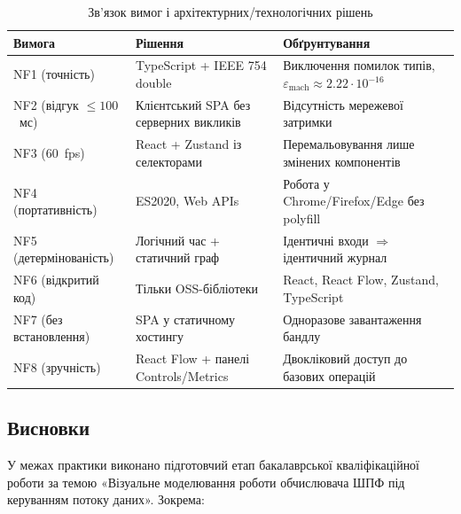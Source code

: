 \documentclass[14pt,a4paper]{extarticle}
\begin{document}
\begin{table}[H]
  \caption{Зв'язок вимог і архітектурних/технологічних рішень}
  \label{tab:req_to_tech}
  \centering
  \small
  \begin{tabular}{p{2.2cm}p{5.6cm}p{6.0cm}}
    \toprule
    Вимога & Рішення & Обґрунтування \\
    \midrule
    NF1 (точність)        & TypeScript + IEEE 754 double         & Виключення помилок типів, $\varepsilon_{\mathrm{mach}}{\approx}2.22{\cdot}10^{-16}$ \\
    NF2 (відгук $\le 100$~мс) & Клієнтський SPA без серверних викликів & Відсутність мережевої затримки \\
    NF3 (60~fps)          & React + Zustand із селекторами       & Перемальовування лише змінених компонентів \\
    NF4 (портативність)   & ES2020, Web APIs                     & Робота у Chrome/Firefox/Edge без polyfill \\
    NF5 (детермінованість) & Логічний час + статичний граф       & Ідентичні входи $\Rightarrow$ ідентичний журнал \\
    NF6 (відкритий код)   & Тільки OSS-бібліотеки                & React, React Flow, Zustand, TypeScript \\
    NF7 (без встановлення) & SPA у статичному хостингу           & Одноразове завантаження бандлу \\
    NF8 (зручність)       & React Flow + панелі Controls/Metrics & Двокліковий доступ до базових операцій \\
    \bottomrule
  \end{tabular}
\end{table}

\subsection*{Висновки}

У межах практики виконано підготовчий етап бакалаврської
кваліфікаційної роботи за темою «Візуальне моделювання роботи
обчислювача ШПФ під керуванням потоку даних». Зокрема:
\end{document}

